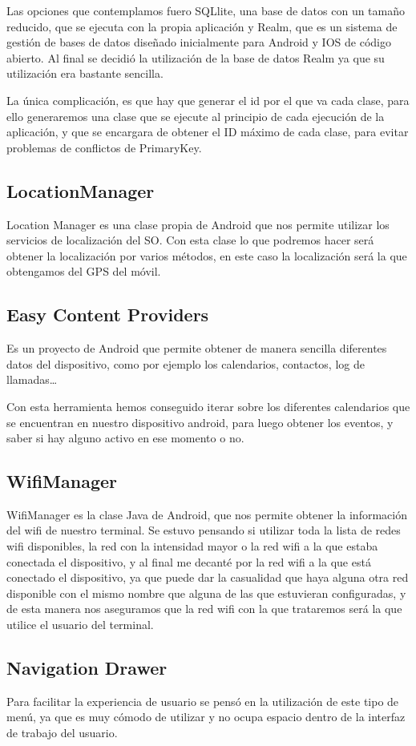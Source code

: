 Las opciones que contemplamos fuero SQLlite, una base de datos con un tamaño reducido, que se ejecuta con la propia aplicación y Realm, que es un sistema de gestión de bases de datos diseñado inicialmente para Android y IOS de código abierto.
Al final se decidió la utilización de la base de datos Realm ya que su utilización era bastante sencilla.

La única complicación, es que hay que generar el id por el que va cada clase, para ello generaremos una clase que se ejecute al principio de cada ejecución de la aplicación, y que se encargara de obtener el ID máximo de cada clase, para evitar problemas de conflictos de PrimaryKey.

\subsection{LocationManager}
Location Manager es una clase propia de Android que nos permite utilizar los servicios de localización del SO. Con esta clase lo que podremos hacer será obtener la localización por varios métodos, en este caso la localización será la que obtengamos del GPS del móvil. 

\subsection{Easy Content Providers}

Es un proyecto de Android que permite obtener de manera sencilla diferentes datos del dispositivo, como por ejemplo los calendarios, contactos, log de llamadas\ldots

Con esta herramienta hemos conseguido iterar sobre los diferentes calendarios que se encuentran en nuestro dispositivo android, para luego obtener los eventos, y saber si hay alguno activo en ese momento o no.

\subsection{WifiManager}
WifiManager es la clase Java de Android, que nos permite obtener la información del wifi de nuestro terminal. Se estuvo pensando si utilizar toda la lista de redes wifi disponibles, la red con la intensidad mayor o la red wifi a la que estaba conectada el dispositivo, y al final me decanté por la red wifi a la que está conectado el dispositivo, ya que puede dar la casualidad que haya alguna otra red disponible con el mismo nombre que alguna de las que estuvieran configuradas, y de esta manera nos aseguramos que la red wifi con la que trataremos será la que utilice el usuario del terminal.

\subsection{Navigation Drawer}
Para facilitar la experiencia de usuario se pensó en la utilización de este tipo de menú, ya que es muy cómodo de utilizar y no ocupa espacio dentro de la interfaz de trabajo del usuario.